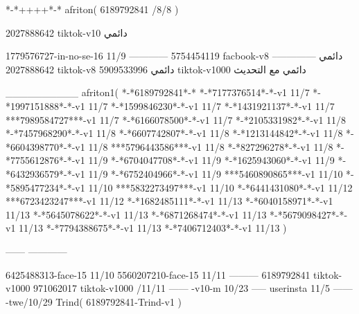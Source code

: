 *-*++++*-*
afriton(
6189792841 /8/8
)

2027888642 tiktok-v10
دائمي

1779576727-in-no-se-16 11/9
------------
5754454119 facbook-v8
دائمي
--------------
2027888642 tiktok-v8
دائمي
5909533996 tiktok-v1000
دائمي مع التحديث

__________
afriton1(
*-*6189792841*-*
*-*7177376514*-*-v1 11/7
*-*1997151888*-*-v1 11/7
*-*1599846230*-*-v1 11/7
*-*1431921137*-*-v1 11/7
***7989584727***-v1 11/7
*-*6166078500*-*-v1 11/7
*-*2105331982*-*-v1 11/8
*-*7457968290*-*-v1 11/8
*-*6607742807*-*-v1 11/8
*-*1213144842*-*-v1 11/8
*-*6604398770*-*-v1 11/8
***5796443586***-v1 11/8
*-*827296278*-*-v1 11/8
*-*7755612876*-*-v1 11/9
*-*6704047708*-*-v1 11/9
*-*1625943060*-*-v1 11/9
*-*6432936579*-*-v1 11/9
*-*6752404966*-*-v1 11/9
***5460890865***-v1 11/10
*-*5895477234*-*-v1 11/10
***5832273497***-v1 11/10
*-*6441431080*-*-v1 11/12
***6723423247***-v1 11/12
*-*1682485111*-*-v1 11/13
*-*6040158971*-*-v1 11/13
*-*5645078622*-*-v1 11/13
*-*6871268474*-*-v1 11/13
*-*5679098427*-*-v1 11/13
*-*7794388675*-*-v1 11/13
*-*7406712403*-*-v1 11/13
)

------
------------

6425488313-face-15 11/10
5560207210-face-15 11/11
---------
6189792841 tiktok-v1000
971062017 tiktok-v1000 /11/11
------
-v10-m 10/23
-----
userinsta 11/5
------
-twe/10/29
Trind(
6189792841-Trind-v1 
)
